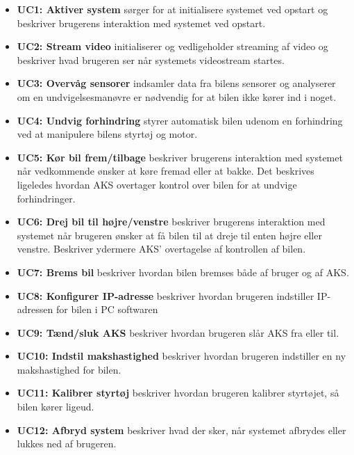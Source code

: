 \begin{itemize}

\item \textbf{UC1: Aktiver system} sørger for at initialisere systemet ved opstart og beskriver brugerens interaktion med systemet ved opstart.

\item \textbf{UC2: Stream video} initialiserer og vedligeholder streaming af video og beskriver hvad brugeren ser når systemets videostream startes.

\item \textbf{UC3: Overvåg sensorer} indsamler data fra bilens sensorer og analyserer om en undvigelsesmanøvre er nødvendig for at bilen ikke kører ind i noget.

\item \textbf{UC4: Undvig forhindring} styrer automatisk bilen udenom en forhindring ved at manipulere bilens styrtøj og motor.

\item \textbf{UC5: Kør bil frem/tilbage} beskriver brugerens interaktion med systemet når vedkommende ønsker at køre fremad eller at bakke. 
Det beskrives ligeledes hvordan AKS overtager kontrol over bilen for at undvige forhindringer.

\item \textbf{UC6: Drej bil til højre/venstre} beskriver brugerens interaktion med systemet når brugeren ønsker at få bilen til at dreje til enten højre eller venstre. Beskriver ydermere AKS' overtagelse af kontrollen af bilen.

\item \textbf{UC7: Brems bil} beskriver hvordan bilen bremses både af bruger og af AKS.

\item \textbf{UC8: Konfigurer IP-adresse} beskriver hvordan brugeren indstiller IP-adressen for bilen i PC softwaren

\item \textbf{UC9: Tænd/sluk AKS} beskriver hvordan brugeren slår AKS fra eller til.

\item \textbf{UC10: Indstil makshastighed} beskriver hvordan brugeren indstiller en ny makshastighed for bilen.

\item \textbf{UC11: Kalibrer styrtøj} beskriver hvordan brugeren kalibrer styrtøjet, så bilen kører ligeud.

\item \textbf{UC12: Afbryd system} beskriver hvad der sker, når systemet afbrydes eller lukkes ned af brugeren.

\end{itemize}

